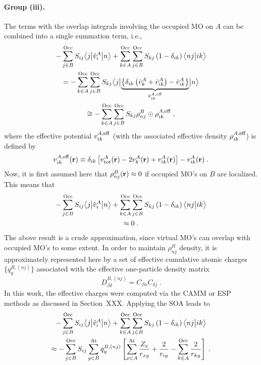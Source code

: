 \paragraph{Group (iii).}
The terms with the overlap integrals involving the occupied MO on $A$
can be combined into a single summation term, i.e.,
\begin{multline}
       - \sum_{j\in B}^{\rm Occ} S_{ij} \tBraKet{j}{\hat{v}^A_{i} }{n}  
     + \sum_{k\in A}^{\rm Occ} \sum_{j\in B}^{\rm Occ}  
        S_{kj} \left( 1 - \delta_{ik} \right) 
        \BraKet{nj}{ik} \\ = -
 \sum_{k\in A}^{\rm Occ} 
 \sum_{j\in B}^{\rm Occ}
 S_{kj} 
 \tBraKet{j}{
 \underbrace{
 \left\{ 
  \delta_{ik} \left( \hat{v}^A_{k} + \hat{v}^A_{ik} \right)
  - \hat{v}^A_{ik}
 \right\} 
  }_{\hat{v}^{A,{\rm eff}}_{ik}}
 }{n}  \\ \cong -
%
  \sum_{k\in A}^{\rm Occ} 
 \sum_{j\in B}^{\rm Occ}
 S_{kj} 
 \rho_{nj}^B \odot \rho^{A,{\rm eff}}_{ik} \;,
\end{multline}
%
where the effective potential ${v}^{A,{\rm eff}}_{ik}$ (with the associated 
effective density $\rho^{A,{\rm eff}}_{ik}$) 
is defined by
%
\begin{equation}
 {v}^{A,{\rm eff}}_{ik}({\bf r}) \equiv
 \delta_{ik} 
 \left[
  v^A_{\rm tot} ({\bf r}) - 2 v^A_{k} ({\bf r}) + v^A_{ik} ({\bf r})
 \right] 
  - v^A_{ik} ({\bf r}) \;.
\end{equation}
%
Now, it is first assumed here that $\rho^{B}_{nj} ({\bf r}) \approx 0$ if occupied MO's on $B$ are localized.
This means that
%
\begin{multline}
        - \sum_{j\in B}^{\rm Occ} S_{ij} \bigl\langle {j} \bigl\lvert {\hat{v}^A_{i} } \bigl\lvert {n} \bigr\rangle  
     + \sum_{k\in A}^{\rm Occ} \sum_{j\in B}^{\rm Occ}  
        S_{kj} \left( 1 - \delta_{ik} \right) 
        \bigl\langle {nj} \bigl\lvert {ik} \bigr\rangle  \\
 \approx 0 \;.
\end{multline}
%
The above result is a crude approximation, since virtual MO's can overlap with occupied MO's to some extent.
In order to maintain $\rho^{B}_{nj}$ density, it is approximately represented here by a set of effective 
cumulative
atomic charges $\{ q^{B,(nj)}_{y} \}$ associated with the effective one\hyp{}particle density matrix
%
\begin{equation}
 D^{B,(nj)}_{\beta\delta} = C_{\beta n} C_{\delta j} \;.
\end{equation}
%
In this work, the effective charges were computed via the CAMM or ESP methods as
discussed in Section~XXX. Applying the SOA leads to 
%
\begin{multline}
        - \sum_{j\in B}^{\rm Occ} S_{ij} \bigl\langle {j} \bigl\lvert {\hat{v}^A_{i} } \bigl\lvert {n} \bigr\rangle  
     + \sum_{k\in A}^{\rm Occ} \sum_{j\in B}^{\rm Occ}  
        S_{kj} \left( 1 - \delta_{ik} \right) 
        \bigl\langle {nj} \bigl\lvert {ik} \bigr\rangle  \\
 \approx  -
 \sum_{j\in B}^{\rm Occ} S_{ij}
 \sum_{y\in B}^{\rm At} 
 q^{B,(nj)}_{y} 
 \left[ 
   \sum_{x\in A}^{\rm At}
   \frac{Z_x}{r_{xy}}
  + \frac{2}{r_{iy}}
  - \sum_{k\in A}^{\rm Occ}
    \frac{2}{r_{ky}} 
 \right]
 \;.
\end{multline}
%


